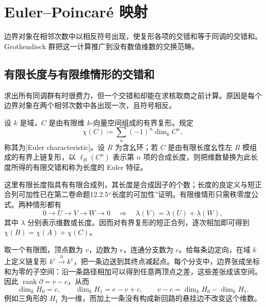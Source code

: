 
\section{Euler–Poincaré 映射}
\label{b4:sec:0504}

边界对象在相邻次数中以相反符号出现，使复形各项的交错和等于同调的交错和。Grothendieck 群把这一计算推广到没有数值维数的交换范畴。

%
%
%

\subsection{有限长度与有限维情形的交错和}
\label{b4:subsec:0504:01}

求出所有同调群有时很费力，但一个交错和却能在求核取商之前计算。原因是每个边界对象在两个相邻次数中各出现一次，且符号相反。

\begin{definition}\label{b4:def:euler-characteristic}
设 \(k\) 是域，\(C\) 是由有限维 \(k\)-向量空间组成的有界复形。规定
\[
\chi(C)\coloneqq\sum_n(-1)^n\dim_k C^n,
\]
称其为[Euler characteristic]。设 \(R\) 为含幺环；若 \(C\) 是由有限长度幺性左 \(R\) 模组成的有界上链复形，以 \(\ell_R(C^n)\) 表示第 \(n\) 项的合成长度，则把维数替换为此长度所得的有限交错和称为长度的 Euler 特征。
\end{definition}

这里有限长度指具有有限合成列，其长度是合成因子的个数；长度的良定义与短正合列可加性已在第二卷命题12.2.5“长度的可加性”证明。有限维情形只需秩零度公式。两种情形都有
\[
0\to U\to V\to W\to0
\quad\Longrightarrow\quad
\lambda(V)=\lambda(U)+\lambda(W),
\]
其中 \(\lambda\) 分别表示维数或长度。因而对有界复形的短正合列，逐次相加即可得到 \(\chi(B)=\chi(A)+\chi(C)\)。

\begin{example}\label{b4:exm:graph-euler}
取一个有限图，顶点数为 \(v\)，边数为 \(e\)，连通分支数为 \(c\)。给每条边定向，在域 \(k\) 上定义链复形 \(k^e\xrightarrow{\partial}k^v\)，把一条边送到其终点减起点。每个分支中，边界张成坐标和为零的子空间：沿一条路径相加可以得到任意两顶点之差，这些差张成该空间。因此 \(\operatorname{rank}\partial=v-c\)，从而
\[
\dim_kH_0=c,\qquad \dim_kH_1=e-v+c,
\qquad v-e=\dim_kH_0-\dim_kH_1.
\]
例如三角形的 \(H_1\) 为一维，而加上一条没有构成新回路的悬挂边不改变这个维数。
\end{example}

